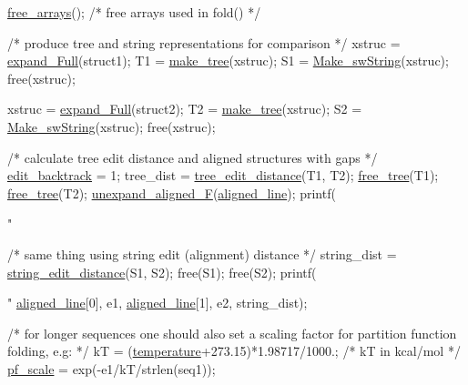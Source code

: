\begin{DoxyCodeInclude}
   \mbox{\hyperlink{group__mfe__fold__single_ga107fdfe5fd641868156bfd849f6866c7}{free\_arrays}}();     \textcolor{comment}{/* free arrays used in fold() */}

   \textcolor{comment}{/* produce tree and string representations for comparison */}
   xstruc = \mbox{\hyperlink{group__struct__utils_ga78d73cd54a068ef2812812771cdddc6f}{expand\_Full}}(struct1);
   T1 = \mbox{\hyperlink{treedist_8h_a08fe4d5afd385dce593b86eaf010c6e3}{make\_tree}}(xstruc);
   S1 = \mbox{\hyperlink{stringdist_8h_a3125991b3a403b3f89230474deb3f22e}{Make\_swString}}(xstruc);
   free(xstruc);

   xstruc = \mbox{\hyperlink{group__struct__utils_ga78d73cd54a068ef2812812771cdddc6f}{expand\_Full}}(struct2);
   T2 = \mbox{\hyperlink{treedist_8h_a08fe4d5afd385dce593b86eaf010c6e3}{make\_tree}}(xstruc);
   S2 = \mbox{\hyperlink{stringdist_8h_a3125991b3a403b3f89230474deb3f22e}{Make\_swString}}(xstruc);
   free(xstruc);

   \textcolor{comment}{/* calculate tree edit distance and aligned structures with gaps */}
   \mbox{\hyperlink{dist__vars_8h_aa03194c513af6b860e7b33e370b82bdb}{edit\_backtrack}} = 1;
   tree\_dist = \mbox{\hyperlink{treedist_8h_a3b21f1925f7071f46d93431a835217bb}{tree\_edit\_distance}}(T1, T2);
   \mbox{\hyperlink{treedist_8h_acbc1cb9bce582ea945e4a467c76a57aa}{free\_tree}}(T1); \mbox{\hyperlink{treedist_8h_acbc1cb9bce582ea945e4a467c76a57aa}{free\_tree}}(T2);
   \mbox{\hyperlink{group__struct__utils_ga1054c4477d53b31d79d4cb132100e87a}{unexpand\_aligned\_F}}(\mbox{\hyperlink{dist__vars_8h_ac1605fe3448ad0a0b809c4fb8f6a854a}{aligned\_line}});
   printf(\textcolor{stringliteral}{"%

   \textcolor{comment}{/* same thing using string edit (alignment) distance */}
   string\_dist = \mbox{\hyperlink{stringdist_8h_a89e3c335ef17780576d7c0e713830db9}{string\_edit\_distance}}(S1, S2);
   free(S1); free(S2);
   printf(\textcolor{stringliteral}{"%
          \mbox{\hyperlink{dist__vars_8h_ac1605fe3448ad0a0b809c4fb8f6a854a}{aligned\_line}}[0], e1, \mbox{\hyperlink{dist__vars_8h_ac1605fe3448ad0a0b809c4fb8f6a854a}{aligned\_line}}[1], e2, string\_dist);

   \textcolor{comment}{/* for longer sequences one should also set a scaling factor for}
\textcolor{comment}{      partition function folding, e.g: */}
   kT = (\mbox{\hyperlink{group__model__details_gab4b11c8d9c758430960896bc3fe82ead}{temperature}}+273.15)*1.98717/1000.;  \textcolor{comment}{/* kT in kcal/mol */}
   \mbox{\hyperlink{group__model__details_gad3b22044065acc6dee0af68931b52cfd}{pf\_scale}} = exp(-e1/kT/strlen(seq1));

}}
\end{DoxyCodeInclude}
